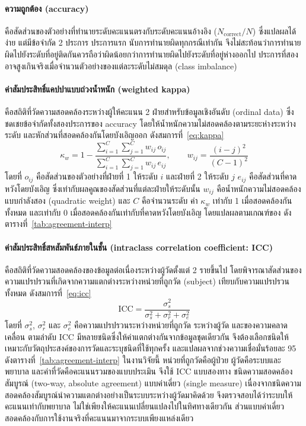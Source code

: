 \paragraph{ความถูกต้อง (accuracy)}
คือสัดส่วนของตัวอย่างที่ทำนายระดับคะแนนตรงกับระดับคะแนนอ้างอิง ($N_{\text{correct}}/N$) ซึ่งแปลผลได้ง่าย แต่มีข้อจำกัด 2 ประการ
ประการแรก นับการทำนายผิดทุกกรณีเท่ากัน จึงไม่สะท้อนว่าการทำนายผิดไปยังระดับที่อยู่ติดกันควรถือว่าผิดน้อยกว่าการทำนายผิดไปยังระดับที่อยู่ห่างออกไป
ประการที่สอง อาจสูงเกินจริงเมื่อจำนวนตัวอย่างของแต่ละระดับไม่สมดุล (class imbalance)

\paragraph{ค่าสัมประสิทธิ์แคปปาแบบถ่วงน้ำหนัก (weighted kappa)}
คือสถิติที่วัดความสอดคล้องระหว่างผู้ให้คะแนน 2 ฝ่ายสำหรับข้อมูลเชิงอันดับ (ordinal data) \citep{Cohen1968}
ซึ่งชดเชยข้อจำกัดทั้งสองประการของ accuracy โดยให้น้ำหนักความไม่สอดคล้องตามระยะห่างระหว่างระดับ และหักส่วนที่สอดคล้องกันโดยบังเอิญออก ดังสมการที่~\eqref{eq:kappa}
\begin{equation}
\kappa_w = 1 - \frac{\sum_{i=1}^{C}\sum_{j=1}^{C} w_{ij}\, o_{ij}}{\sum_{i=1}^{C}\sum_{j=1}^{C} w_{ij}\, e_{ij}}, \qquad w_{ij} = \frac{(i-j)^2}{(C-1)^2}
\label{eq:kappa}
\end{equation}
โดยที่ $o_{ij}$ คือสัดส่วนของตัวอย่างที่ฝ่ายที่ 1 ให้ระดับ $i$ และฝ่ายที่ 2 ให้ระดับ $j$
$e_{ij}$ คือสัดส่วนที่คาดหวังโดยบังเอิญ ซึ่งเท่ากับผลคูณของสัดส่วนที่แต่ละฝ่ายให้ระดับนั้น
$w_{ij}$ คือน้ำหนักความไม่สอดคล้องแบบกำลังสอง (quadratic weight) และ $C$ คือจำนวนระดับ
ค่า $\kappa_w$ เท่ากับ 1 เมื่อสอดคล้องกันทั้งหมด และเท่ากับ 0 เมื่อสอดคล้องกันเท่ากับที่คาดหวังโดยบังเอิญ
โดยแปลผลตามเกณฑ์ของ \citet{Landis1977} ดังตารางที่~\ref{tab:agreement-interp}

\paragraph{ค่าสัมประสิทธิ์สหสัมพันธ์ภายในชั้น (intraclass correlation coefficient: ICC)}
คือสถิติที่วัดความสอดคล้องของข้อมูลต่อเนื่องระหว่างผู้วัดตั้งแต่ 2 รายขึ้นไป
โดยพิจารณาสัดส่วนของความแปรปรวนที่เกิดจากความแตกต่างระหว่างหน่วยที่ถูกวัด (subject) เทียบกับความแปรปรวนทั้งหมด ดังสมการที่~\eqref{eq:icc}
\begin{equation}
\mathrm{ICC} = \frac{\sigma^2_{s}}{\sigma^2_{s} + \sigma^2_{r} + \sigma^2_{e}}
\label{eq:icc}
\end{equation}
โดยที่ $\sigma^2_{s}$, $\sigma^2_{r}$ และ $\sigma^2_{e}$ คือความแปรปรวนระหว่างหน่วยที่ถูกวัด ระหว่างผู้วัด และของความคลาดเคลื่อน ตามลำดับ
ICC มีหลายชนิดซึ่งให้ค่าแตกต่างกันจากข้อมูลชุดเดียวกัน จึงต้องเลือกชนิดให้เหมาะกับวัตถุประสงค์ของการวัดและระบุชนิดที่ใช้ทุกครั้ง
และแปลผลจากช่วงความเชื่อมั่นร้อยละ 95 \citep{Koo2016} ดังตารางที่~\ref{tab:agreement-interp}
ในงานวิจัยนี้ หน่วยที่ถูกวัดคือผู้ป่วย ผู้วัดคือระบบและพยาบาล และค่าที่วัดคือคะแนนรวมของแบบประเมิน
จึงใช้ ICC แบบสองทาง ชนิดความสอดคล้องสัมบูรณ์ (two-way, absolute agreement) แบบค่าเดี่ยว (single measure)
เนื่องจากชนิดความสอดคล้องสัมบูรณ์นำความแตกต่างอย่างเป็นระบบระหว่างผู้วัดมาคิดด้วย จึงตรวจสอบได้ว่าระบบให้คะแนนเท่ากับพยาบาล
ไม่ใช่เพียงให้คะแนนเปลี่ยนแปลงไปในทิศทางเดียวกัน ส่วนแบบค่าเดี่ยวสอดคล้องกับการใช้งานจริงที่คะแนนมาจากระบบเพียงแหล่งเดียว

